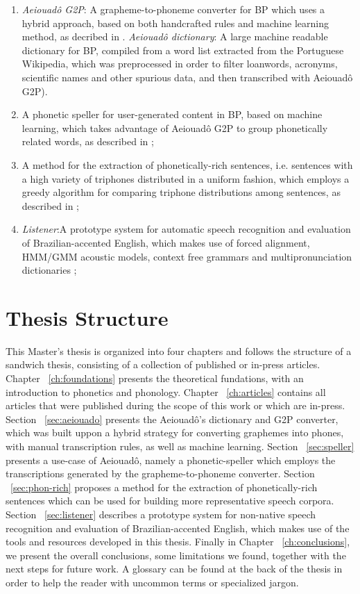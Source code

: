 \begin{enumerate}
 \item \emph{Aeiouad\^o G2P}: A grapheme-to-phoneme converter for \ac{BP} which uses a hybrid approach, based on both handcrafted rules and machine learning method, as decribed in \citeauthor{Mendonca2014} \cite{Mendonca2014}. \emph{Aeiouad\^o dictionary}: A large machine readable dictionary for \ac{BP}, compiled from a word list extracted from the Portuguese Wikipedia, which was preprocessed in order to filter loanwords, acronyms, scientific names and other spurious data, and then transcribed with Aeiouad\^o G2P).
 \item A phonetic speller for user-generated content in \ac{BP}, based on machine learning, which takes advantage of Aeiouad\^o G2P to group phonetically related words, as described in \citeauthor{Mendonca2015} \cite{Mendonca2015}; 
 \item A method for the extraction of phonetically-rich sentences, i.e. sentences with a high variety of triphones distributed in a uniform fashion, which employs a greedy algorithm for comparing triphone distributions among sentences, as described in \citeauthor{Mendonca2014b} \cite{Mendonca2014b};
 \item \emph{Listener}:A prototype system for automatic speech recognition and evaluation of Brazilian-accented English, which makes use of forced alignment, \ac{HMM}/\ac{GMM} acoustic models, context free grammars and multipronunciation dictionaries \cite{Mendonca2016};
\end{enumerate}

\section*{Thesis Structure}

This Master's thesis is organized into four chapters and follows the structure of a sandwich thesis, consisting of a collection of published or in-press articles. Chapter ~\ref{ch:foundations} presents the theoretical fundations, with an introduction to phonetics and phonology. Chapter ~\ref{ch:articles} contains all articles that were published during the scope of this work or which are in-press. Section ~\ref{sec:aeiouado} presents the Aeiouad\^o's dictionary and \ac{G2P} converter, which was built uppon a hybrid strategy for converting graphemes into phones, with manual transcription rules, as well as machine learning. Section ~\ref{sec:speller} presents a use-case of Aeiouad\^o, namely a phonetic-speller which employs the transcriptions generated by the grapheme-to-phoneme converter. Section ~\ref{sec:phon-rich} proposes a method for the extraction of phonetically-rich sentences which can be used for building more representative speech corpora. Section ~\ref{sec:listener} describes a prototype system for non-native speech recognition and evaluation of Brazilian-accented English, which makes use of the tools and resources developed in this thesis. Finally in Chapter ~\ref{ch:conclusions}, we present the overall conclusions, some limitations we found, together with the next steps for future work. A glossary can be found at the back of the thesis in order to help the reader with uncommon terms or specialized jargon.